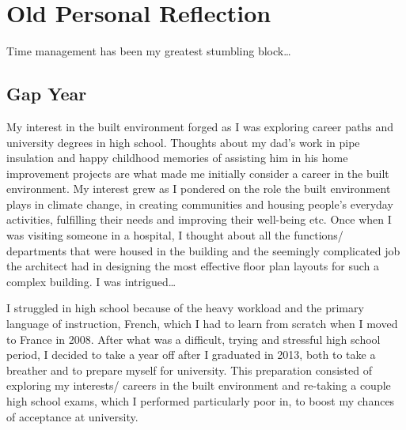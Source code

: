 \chapter{Old Personal Reflection} %

\label{Chapter4} %



Time management has been my greatest stumbling block…



\section{Gap Year}

My interest in the built environment forged as I was exploring career paths and university degrees in high school.
Thoughts about my dad’s work in pipe insulation and happy childhood memories of assisting him in his home improvement projects are what made me initially consider a career in the built environment.
My interest grew as I pondered on the role the built environment plays in climate change, in creating communities and housing people’s everyday activities, fulfilling their needs and improving their well-being etc.
Once when I was visiting someone in a hospital, I thought about all the functions/ departments that were housed in the building and the seemingly complicated job the architect had in designing the most effective floor plan layouts for such a complex building.
I was intrigued…

I struggled in high school because of the heavy workload and the primary language of instruction, French, which I had to learn from scratch when I moved to France in 2008.
After what was a difficult, trying and stressful high school period, I decided to take a year off after I graduated in 2013, both to take a breather and to prepare myself for university.
This preparation consisted of exploring my interests/ careers in the built environment and re-taking a couple high school exams, which I performed particularly poor in, to boost my chances of acceptance at university.


